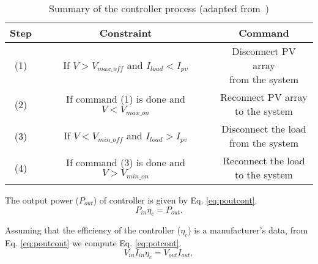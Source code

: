 \begin{table}[!t]
\renewcommand{\arraystretch}{1.3}
\caption{Summary of the controller process (adapted from~\cite{Hansen})}
\label{table:controller}
\centering
\begin{tabular}{c | c | c }
\hline
\hline
Step  & Constraint & Command\\
\hline
\hline
(1) & \makecell{If $V > V_{max \_ off}$ \\and $I_{load} < I_{pv}$} & \makecell{Disconnect PV array \\from the system}\\
\hline
(2) & \makecell{If command (1) is \\done and $V < V_{max \_ on}$} & \makecell{Reconnect PV array \\to the system}\\
\hline
(3) & \makecell{If $V < V_{min \_ off}$ and \\ $I_{load} > I_{pv}$} & \makecell{Disconnect the load \\from the system}\\
\hline
(4) & \makecell{If command (3) is \\ done and $V > V_{min \_ on}$} & \makecell{Reconnect the load \\to the system}\\
\hline
\hline
\end{tabular}
\end{table}

%
The output power ($ P_{out} $) of controller is given by Eq. \eqref{eq:poutcont}.
\begin{equation}
\label{eq:poutcont}
P_{in} \eta_{c} = P_{out}.
\end{equation}

Assuming that the efficiency of the controller ($ \eta_{c} $) is a manufacturer's data, from Eq. \eqref{eq:poutcont} we compute Eq. \eqref{eq:potcont}.
\begin{equation}
\label{eq:potcont}
V_{in} I_{in} \eta_{c} = V_{out} I_{out},
\end{equation}

